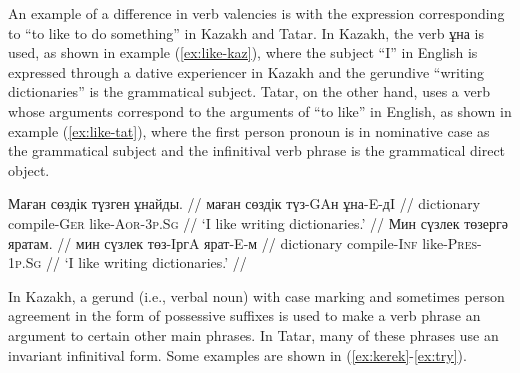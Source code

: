\documentclass[a4paper,11pt]{article}
\newcommand{\gmk}[1]{{\qipb\scshape #1}}
\newcommand{\eng}[1]{`#1'}
\begin{document}



An example of a difference in verb valencies is with the expression corresponding 
to ``to like to do something'' in Kazakh and Tatar.  In Kazakh, the verb ұна is used, as shown in 
example (\ref{ex:like-kaz}), where the subject ``I'' in English is expressed through a dative 
experiencer in Kazakh and the gerundive ``writing dictionaries'' is the grammatical subject.  Tatar, on the 
other hand, uses a verb whose arguments correspond to the arguments of ``to like'' in English, as 
shown in example (\ref{ex:like-tat}), where the first person pronoun is in nominative case as 
the grammatical subject and the infinitival verb phrase is the grammatical direct object.

\pex[everygla=,everyglb=,everyglc=,aboveglbskip=0pt,aboveglftskip=0ex]  %
\a\label{ex:like-kaz}
\begingl
\gla Маған сөздік түзген ұнайды. //
\glb маған сөздік түз-GAн ұна-E-дI //
\glb \gmk{1p.Sg.Dat} dictionary compile-\gmk{Ger} like-\gmk{Aor}-\gmk{3p.Sg} //
\glft \eng{I like writing dictionaries.} //
\endgl
\a\label{ex:like-tat}
\begingl
\gla Мин сүзлек төзергә яратам. //
\glb мин сүзлек төз-IргA ярат-E-м //
\glb \gmk{1p.Sg} dictionary compile-\gmk{Inf} like-\gmk{Pres}-\gmk{1p.Sg} //
\glft \eng{I like writing dictionaries.} //
\endgl
\xe


In Kazakh, a gerund (i.e., verbal noun) with case marking and sometimes person agreement in the form of 
possessive suffixes is used to make a verb phrase an argument to certain other main phrases.  In Tatar, many 
of these phrases use an invariant infinitival form.  Some examples are shown in (\ref{ex:kerek}-\ref{ex:try}).

%
\end{document}
